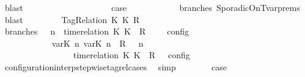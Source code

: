 \begin{isabellebody}
\ blast\isanewline
\ \ \ \ \ \ \ \ \isamarkupfalse%
\isanewline
\ \ \ \ \ \ \ \ \isamarkupfalse%
\ \isamarkupfalse%
\ {\isacharquery}case\isanewline
\ \ \ \ \ \ \ \ \ \ \isamarkupfalse%
\ branches\ SporadicOnTvar{\isachardot}prems{\isacharparenleft}{}{\isacharparenright}\ \isamarkupfalse%
\ blast\isanewline
\ \ \isamarkupfalse%
\isanewline
\ \ \ \ \isamarkupfalse%
\ {\isacharparenleft}TagRelation\ K\ K\ R{\isacharparenright}\isanewline
\ \ \ \ \ \ \isamarkupfalse%
\ branches{\isacharcolon}\ {\isacartoucheopen}{\isasymlbrakk}\ {\isasymGamma}{\isacharcomma}\ n\ {\isasymturnstile}\ {\isacharparenleft}{\isacharparenleft}time{\isacharminus}relation\ {\isasymlfloor}K\ K\ {\isasymin}\ R{\isacharparenright}\ {\isacharhash}\ {\isasymPsi}{\isacharparenright}\ {\isasymtriangleright}\ {\isasymPhi}\ {\isasymrbrakk}\isactrlsub c\isactrlsub o\isactrlsub n\isactrlsub f\isactrlsub i\isactrlsub g\isanewline
\ \ \ \ \ \ \ \ \ \ {\isacharequal}\ {\isasymlbrakk}\ {\isacharparenleft}{\isacharparenleft}{\isasymlfloor}{\isasymtau}\isactrlsub v\isactrlsub a\isactrlsub r{\isacharparenleft}K\ n{\isacharparenright}{\isacharcomma}\ {\isasymtau}\isactrlsub v\isactrlsub a\isactrlsub r{\isacharparenleft}K\ n{\isacharparenright}{\isasymrfloor}\ {\isasymin}\ R{\isacharparenright}\ {\isacharhash}\ {\isasymGamma}{\isacharparenright}{\isacharcomma}\ n\isanewline
\ \ \ \ \ \ \ \ \ \ \ \ \ \ {\isasymturnstile}\ {\isasymPsi}\ {\isasymtriangleright}\ {\isacharparenleft}{\isacharparenleft}time{\isacharminus}relation\ {\isasymlfloor}K\ K\ {\isasymin}\ R{\isacharparenright}\ {\isacharhash}\ {\isasymPhi}{\isacharparenright}\ {\isasymrbrakk}\isactrlsub c\isactrlsub o\isactrlsub n\isactrlsub f\isactrlsub i\isactrlsub g{\isacartoucheclose}\isanewline
\ \ \ \ \ \ \ \ \isamarkupfalse%
\ configuration{\isacharunderscore}interp{\isacharunderscore}stepwise{\isacharunderscore}tagrel{\isacharunderscore}cases\ \isamarkupfalse%
\ simp\isanewline
\ \ \ \ \ \ \isamarkupfalse%
\ {\isacharquery}case\isanewline
\ \ \ \ \ \ \isamarkupfalse%
\ {\isacharminus}\isanewline
\ \ \ \ \ \ \ \ \isamarkupfalse%

\end{isabellebody}
